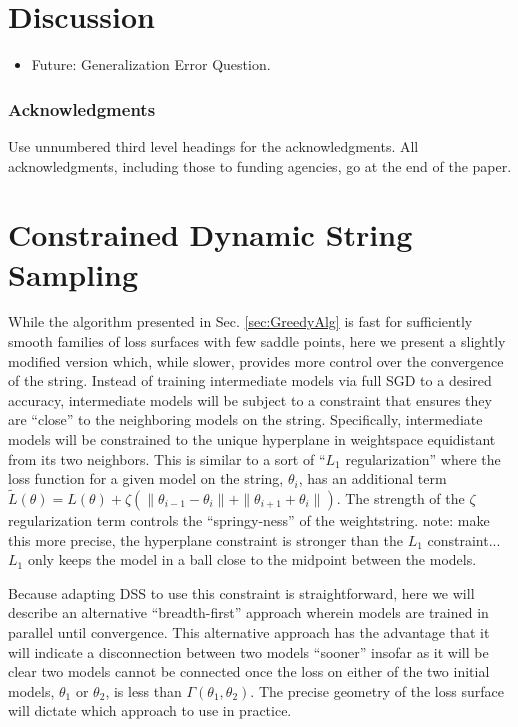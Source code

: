 \documentclass{article} %
\begin{document}
\section{Discussion}
\label{sec:Discussion}
\begin{itemize}
\item Future: Generalization Error Question. 

\end{itemize}


\subsubsection*{Acknowledgments}

Use unnumbered third level headings for the acknowledgments. All
acknowledgments, including those to funding agencies, go at the end of the paper.

\Appendix

\section{Constrained Dynamic String Sampling}
  \label{sec:ConstrainedAlg}
  
  While the algorithm presented in Sec. \ref{sec:GreedyAlg} is fast for sufficiently smooth families of loss surfaces with few saddle points, here we present a slightly modified version which, while slower, provides more control over the convergence of the string.  Instead of training intermediate models via full SGD to a desired accuracy, intermediate models will be subject to a constraint that ensures they are ``close'' to the neighboring models on the string.  Specifically, intermediate models will be constrained to the unique hyperplane in weightspace equidistant from its two neighbors.  This is similar to a sort of ``$L_1$ regularization'' where the loss function for a given model on the string, $\theta_i$, has an additional term $\tilde{L}(\theta) = L(\theta)+\zeta(\|\theta_{i-1} - \theta_i\|+\|\theta_{i+1} + \theta_i\|)$.  The strength of the $\zeta$ regularization term controls the ``springy-ness'' of the weightstring. note: make this more precise, the hyperplane constraint is stronger than the $L_1$ constraint...$L_1$ only keeps the model in a ball close to the midpoint between the models.
  
  Because adapting DSS to use this constraint is straightforward, here we will describe an alternative ``breadth-first'' approach wherein models are trained in parallel until convergence.  This alternative approach has the advantage that it will indicate a disconnection between two models ``sooner'' insofar as it will be clear two models cannot be connected once the loss on either of the two initial models, $\theta_1$ or $\theta_2$, is less than $\Gamma(\theta_1, \theta_2)$.  The precise geometry of the loss surface will dictate which approach to use in practice.
  
\end{document}

